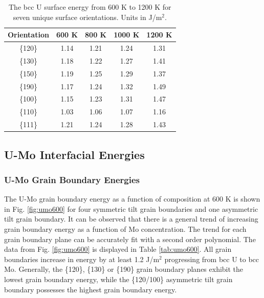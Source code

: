 \documentclass[review]{elsarticle}
\begin{document}
\begin{table}[h]
\caption{The bcc U surface energy from 600 K to 1200 K for seven unique surface orientations. Units in J/m$^{2}$. } \label{tab:usurf}
\begin{center}
\begin{tabular}{|c|c|c|c|c|}
	\hline
	Orientation & 600 K & 800 K & 1000 K & 1200 K \\
	 \hline
	 \{120\} & 1.14 & 1.21 & 1.24 & 1.31 \\
	 \{130\} & 1.18 & 1.22 & 1.27 & 1.41 \\
	 \{150\} & 1.19 & 1.25 & 1.29 & 1.37 \\
	 \{190\} & 1.17 & 1.24 & 1.32 & 1.49 \\
	 \{100\} & 1.15 & 1.23 & 1.31 & 1.47 \\
	 \{110\} & 1.03 & 1.06 & 1.07 & 1.16 \\
	 \{111\} & 1.21 & 1.24 & 1.28 & 1.43 \\	 
	 \hline
\end{tabular}
\end{center}
\label{default}
\end{table}

\FloatBarrier

\subsection{U-Mo Interfacial Energies}
\subsubsection{U-Mo Grain Boundary Energies}

The U-Mo grain boundary energy as a function of composition at 600 K is shown in Fig. \ref{fig:umo600} for four symmetric tilt grain boundaries and one asymmetric tilt grain boundary. It can be observed that there is a general trend of increasing grain boundary energy as a function of Mo concentration. The trend for each grain boundary plane can be accurately fit with a second order polynomial. The data from Fig. \ref{fig:umo600} is displayed in Table \ref{tab:umo600}. All grain boundaries increase in energy by at least 1.2 J/m$^{2}$ progressing from bcc U to bcc Mo. Generally, the \{120\}, \{130\} or \{190\} grain boundary planes exhibit the lowest grain boundary energy, while the \{120/100\} asymmetric tilt grain boundary possesses the highest grain boundary energy. 
\end{document}
